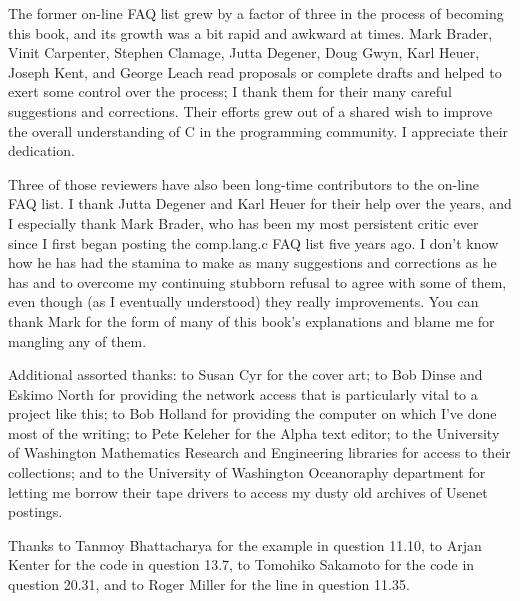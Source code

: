 The former on-line FAQ list grew by a factor of three in the process of becoming
this book, and its growth was a bit rapid and awkward at times. Mark Brader,
Vinit Carpenter, Stephen Clamage, Jutta Degener, Doug Gwyn, Karl Heuer,
Joseph Kent, and George Leach read proposals or complete drafts and helped to
exert some control over the process; I thank them for their many careful
suggestions and corrections.  Their efforts grew out of a shared wish to
improve the overall understanding of C in the programming community.
I appreciate their dedication.

Three of those reviewers have also been long-time contributors to the on-line
FAQ list.  I thank Jutta Degener and Karl Heuer for their help over the years,
and I especially thank Mark Brader, who has been my most persistent critic ever
since I first began posting the comp.lang.c FAQ list five years ago.  I don't
know how he has had the stamina to make as many suggestions and corrections
as he has and to overcome my continuing stubborn refusal to agree with some of
them, even though (as I eventually understood) they really 
improvements.  You can thank Mark for the form of many of this book's
explanations and blame me for mangling any of them.

Additional assorted thanks: to Susan Cyr for the cover art; to Bob Dinse and
Eskimo North for providing the network access that is particularly vital to a
project like this; to Bob Holland for providing the computer on which I've done
most of the writing; to Pete Keleher for the Alpha text editor; to the
University of Washington Mathematics Research and Engineering libraries for
access to their collections; and to the University of Washington Oceanoraphy
department for letting me borrow their tape drivers to access my dusty old
archives of Usenet postings.


Thanks to Tanmoy Bhattacharya for the example in question 11.10, to Arjan
Kenter for the code in question 13.7, to Tomohiko Sakamoto for the code in
question 20.31, and to Roger Miller for the line in question 11.35.

